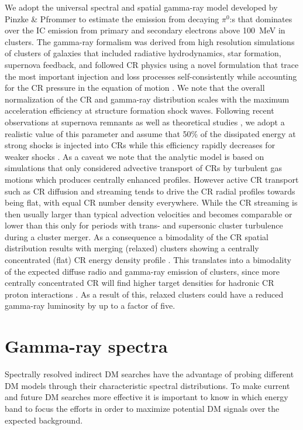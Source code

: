 \documentclass[10pt,aps,pra,reprint,amsmath,amsfonts,amssymb,showpacs,nofootinbib,floatfix]{revtex4-1}
\begin{document}
We adopt the universal spectral and spatial gamma-ray model developed
by Pinzke \& Pfrommer \cite{2010MNRAS.409..449P} to estimate the
emission from decaying $\pi^0$:s that dominates over the IC emission
from primary and secondary electrons above 100~MeV in clusters. The
gamma-ray formalism was derived from high resolution simulations of
clusters of galaxies that included radiative hydrodynamics, star
formation, supernova feedback, and followed CR physics using a novel
formulation that trace the most important injection and loss processes
self-consistently while accounting for the CR pressure in the
equation of motion
\cite{2008A&A...481...33J,2007A&A...473...41E,2006MNRAS.367..113P}.
We note that the overall normalization of the CR and gamma-ray
distribution scales with the maximum acceleration efficiency at
structure formation shock waves. Following recent observations at
supernova remnants \cite{2009Sci...325..719H} as well as theoretical
studies \cite{2005ApJ...620...44K}, we adopt a realistic value of this
parameter and assume that 50\% of the dissipated energy at strong
shocks is injected into CRs while this efficiency rapidly decreases
for weaker shocks \cite{2007A&A...473...41E}. As a caveat we note that
the analytic model is based on simulations that only considered
advective transport of CRs by turbulent gas motions which produces
centrally enhanced profiles. However active CR transport such as CR
diffusion and streaming tends to drive the CR radial profiles towards
being flat, with equal CR number density everywhere. While the CR
streaming is then usually larger than typical advection velocities and
becomes comparable or lower than this only for periods with trans- and
supersonic cluster turbulence during a cluster merger. As a
consequence a bimodality of the CR spatial distribution results with
merging (relaxed) clusters showing a centrally concentrated (flat) CR
energy density profile \cite{2011A&A...527A..99E}. This translates
into a bimodality of the expected diffuse radio and gamma-ray emission
of clusters, since more centrally concentrated CR will find higher
target densities for hadronic CR proton interactions
\cite{2011A&A...527A..99E}. As a result of this, relaxed clusters
could have a reduced gamma-ray luminosity by up to a factor of five.
 

\section{Gamma-ray spectra}
\label{sect:spectral}
Spectrally resolved indirect DM searches have the advantage of probing
different DM models through their characteristic spectral
distributions. To make current and future DM searches more effective
it is important to know in which energy band to focus the efforts in
order to maximize potential DM signals over the expected background.
\end{document}
